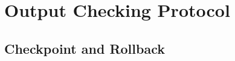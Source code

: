 \section{Output Checking Protocol} \label{sec:output}




\subsection{Checkpoint and Rollback} \label{sec:checkpoint}









